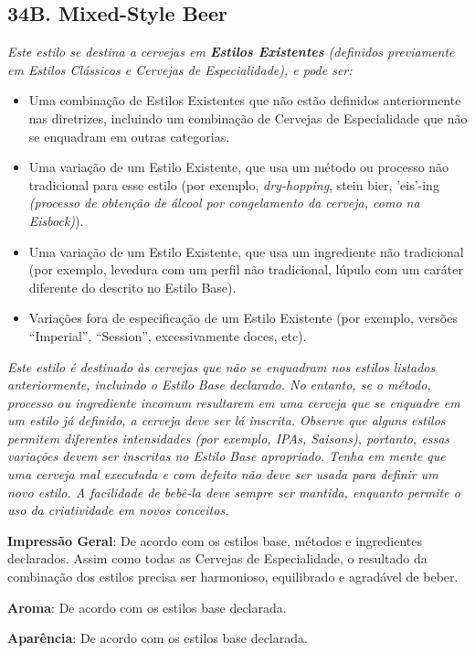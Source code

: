 \subsection*{34B. Mixed-Style Beer}
\textit{Este estilo se destina a cervejas em \textbf{Estilos Existentes} (definidos previamente em Estilos Clássicos e Cervejas de Especialidade), e pode ser:}
\begin{itemize}
  \item Uma combinação de Estilos Existentes que não estão definidos anteriormente nas diretrizes, incluindo um combinação de Cervejas de Especialidade que não se enquadram em outras categorias.
  \item Uma variação de um Estilo Existente, que usa um método ou processo não tradicional para esse estilo (por exemplo, \textit{dry-hopping}, stein bier, 'eis'-ing \textit{(processo de obtenção de álcool por congelamento da cerveja, como na Eisbock)}).
  \item Uma variação de um Estilo Existente, que usa um ingrediente não tradicional (por exemplo, levedura com um perfil não tradicional, lúpulo com um caráter diferente do descrito no Estilo Base).
  \item Variações fora de especificação de um Estilo Existente (por exemplo, versões “Imperial”, “Session”, excessivamente doces, etc).
\end{itemize}
\textit{Este estilo é destinado às cervejas que não se enquadram nos estilos listados anteriormente, incluindo o Estilo Base declarado. No entanto, se o método, processo ou ingrediente incomum resultarem em uma cerveja que se enquadre em um estilo já definido, a cerveja deve ser lá inscrita. Observe que alguns estilos permitem diferentes intensidades (por exemplo, IPAs, Saisons), portanto, essas variações devem ser inscritas no Estilo Base apropriado.}
\textit{Tenha em mente que uma cerveja mal executada e com defeito não deve ser usada para definir um novo estilo. A facilidade de bebê-la deve sempre ser mantida, enquanto permite o uso da criatividade em novos conceitos.}

\textbf{Impressão Geral}: De acordo com os estilos base, métodos e ingredientes declarados. Assim como todas as Cervejas de Especialidade, o resultado da combinação dos estilos precisa ser harmonioso, equilibrado e agradável de beber.

\textbf{Aroma}: De acordo com os estilos base declarada.

\textbf{Aparência}: De acordo com os estilos base declarada.

